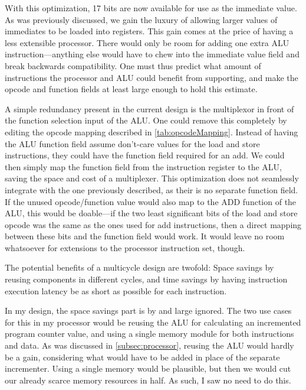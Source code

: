 \documentclass[11pt]{article}
\begin{document}
With this optimization, 17 bits are now available for use as the
immediate value. As was previously discussed, we gain the luxury of
allowing larger values of immediates to be loaded into registers. This
gain comes at the price of having a less extensible processor. There
would only be room for adding one extra ALU instruction---anything
else would have to chew into the immediate value field and break
backwards compatibility. One must thus predict what amount of
instructions the processor and ALU could benefit from supporting, and
make the opcode and function fields at least large enough to hold this
estimate. 

\newline

A simple redundancy present in the current design is the multiplexor
in front of the function selection input of the ALU. One could remove
this completely by editing the opcode mapping described in
\autoref{tab:opcodeMapping}. Instead of having the ALU function field
assume don't-care values for the load and store instructions, they
could have the function field required for an add. We could then
simply map the function field from the instruction register to the
ALU, saving the space and cost of a multiplexer. This optimization
does not seamlessly integrate with the one previously described, as
their is no separate function field. If the unused opcode/function
value would also map to the ADD function of the ALU, this would be
doable---if the two least significant bits of the load and store
opcode was the same as the ones used for add instructions, then a
direct mapping between these bits and the function field would
work. It would leave no room whatsoever for extensions to the
processor instruction set, though.

\newline

The potential benefits of a multicycle design are twofold: Space
savings by reusing components in different cycles, and time savings by
having instruction execution latency be as short as possible for each
instruction. 

In my design, the space savings part is by and large
ignored. The two use cases for this in my processor would be reusing
the ALU for calculating an incremented program counter value, and
using a single memory module for both instructions and data. As was
discussed in \autoref{subsec:processor}, reusing the ALU would hardly
be a gain, considering what would have to be added in place of the
separate incrementer. Using a single memory would be plausible, but
then we would cut our already scarce memory resources in half. As
such, I saw no need to do this. 
\end{document}
